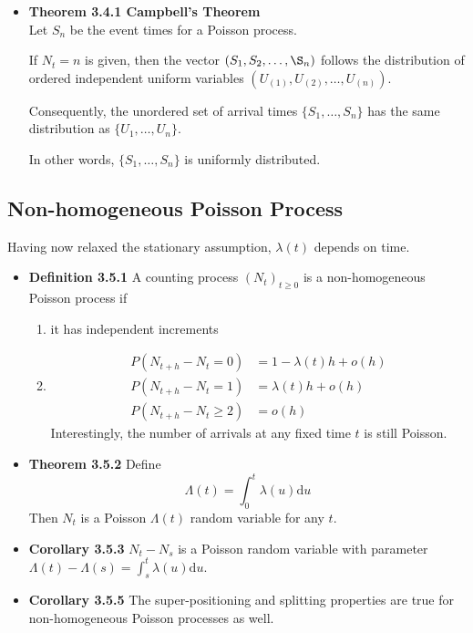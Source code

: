 \documentclass[11pt,a4paper]{article}
\begin{document}
\begin{itemize}
    \item \textbf{Theorem 3.4.1 Campbell's Theorem} \\
        Let $S_n$ be the event times for a Poisson process.

        If $N_t = n$ is given, then the vector $(S_1, S_2, \ldots, \S_n)$
        follows the distribution of ordered independent uniform variables
        $(U_{(1)}, U_{(2)}, \ldots, U_{(n)})$.

        Consequently, the unordered set of arrival times
        $\{S_1, \ldots, S_n\}$ has the same distribution as $\{U_1, \ldots, U_n\}$.

        In other words, $\{S_1, \ldots, S_n\}$ is uniformly distributed.
\end{itemize}

\subsection{Non-homogeneous Poisson Process}

Having now relaxed the stationary assumption, $\lambda(t)$ depends on time.

\begin{itemize}
    \item \textbf{Definition 3.5.1}
        A counting process ${(N_t)}_{t\geq 0}$ is a non-homogeneous Poisson process if
        \begin{enumerate}
            \item it has independent increments
            \item
                \begin{align*}{}
                    P(N_{t+h} - N_t = 0)    & = 1 - \lambda(t)h + o(h) \\
                    P(N_{t+h} - N_t = 1)    & = \lambda(t)h + o(h) \\
                    P(N_{t+h} - N_t \geq 2) & = o(h)
                \end{align*}
                Interestingly, the number of arrivals at any fixed time $t$ is still Poisson.
        \end{enumerate}
    \item \textbf{Theorem 3.5.2}
        Define
        \[
            \Lambda(t) = \int_0^t \lambda(u) \mathrm{d}u
        \]
        Then $N_t$ is a Poisson $\Lambda(t)$ random variable for any $t$.
    \item \textbf{Corollary 3.5.3}
        $N_t - N_s$ is a Poisson random variable with parameter
        $\Lambda(t) - \Lambda(s) = \int_s^t \lambda(u) \mathrm{d}u$.
    \item \textbf{Corollary 3.5.5}
        The super-positioning and splitting properties are true for non-homogeneous
        Poisson processes as well.

\end{itemize}
\end{document}
